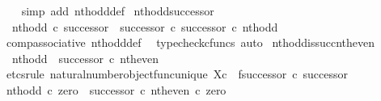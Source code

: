 \begin{isabellebody}
%
\isadelimproof
\ \ %
\endisadelimproof
%
\isatagproof
{}\isamarkupfalse%
\ {\isacharparenleft}{\kern0pt}simp\ add{\isacharcolon}{\kern0pt}\ nth{\isacharunderscore}{\kern0pt}odd{\isacharunderscore}{\kern0pt}def{}{\isacharparenright}{\kern0pt}%
\endisatagproof
{\isafoldproof}%
%
\isadelimproof
\isanewline
%
\endisadelimproof
\isanewline
{}\isamarkupfalse%
\ nth{\isacharunderscore}{\kern0pt}odd{\isacharunderscore}{\kern0pt}successor{}{\isacharcolon}{\kern0pt}\isanewline
\ \ {\isachardoublequoteopen}nth{\isacharunderscore}{\kern0pt}odd\ {\isasymcirc}\isactrlsub c\ successor\ {\isacharequal}{\kern0pt}\ successor\ {\isasymcirc}\isactrlsub c\ successor\ {\isasymcirc}\isactrlsub c\ nth{\isacharunderscore}{\kern0pt}odd{\isachardoublequoteclose}\isanewline
%
\isadelimproof
\ \ %
\endisadelimproof
%
\isatagproof
{}\isamarkupfalse%
\ comp{\isacharunderscore}{\kern0pt}associative{}\ nth{\isacharunderscore}{\kern0pt}odd{\isacharunderscore}{\kern0pt}def{}\ \isamarkupfalse%
\ {\isacharparenleft}{\kern0pt}typecheck{\isacharunderscore}{\kern0pt}cfuncs{\isacharcomma}{\kern0pt}\ auto{\isacharparenright}{\kern0pt}%
\endisatagproof
{\isafoldproof}%
%
\isadelimproof
\isanewline
%
\endisadelimproof
\isanewline
{}\isamarkupfalse%
\ nth{\isacharunderscore}{\kern0pt}odd{\isacharunderscore}{\kern0pt}is{\isacharunderscore}{\kern0pt}succ{\isacharunderscore}{\kern0pt}nth{\isacharunderscore}{\kern0pt}even{\isacharcolon}{\kern0pt}\isanewline
\ \ {\isachardoublequoteopen}nth{\isacharunderscore}{\kern0pt}odd\ {\isacharequal}{\kern0pt}\ successor\ {\isasymcirc}\isactrlsub c\ nth{\isacharunderscore}{\kern0pt}even{\isachardoublequoteclose}\isanewline
%
\isadelimproof
%
\endisadelimproof
%
\isatagproof
{}\isamarkupfalse%
\ {\isacharparenleft}{\kern0pt}etcs{\isacharunderscore}{\kern0pt}rule\ natural{\isacharunderscore}{\kern0pt}number{\isacharunderscore}{\kern0pt}object{\isacharunderscore}{\kern0pt}func{\isacharunderscore}{\kern0pt}unique{\isacharbrackleft}{\kern0pt}\ X{\isacharequal}{\kern0pt}{\isachardoublequoteopen}{\isasymnat}\isactrlsub c{\isachardoublequoteclose}{\isacharcomma}{\kern0pt}\ \ f{\isacharequal}{\kern0pt}{\isachardoublequoteopen}successor\ {\isasymcirc}\isactrlsub c\ successor{\isachardoublequoteclose}{\isacharbrackright}{\kern0pt}{\isacharparenright}{\kern0pt}\isanewline
\ \ \isamarkupfalse%
\ {\isachardoublequoteopen}nth{\isacharunderscore}{\kern0pt}odd\ {\isasymcirc}\isactrlsub c\ zero\ {\isacharequal}{\kern0pt}\ {\isacharparenleft}{\kern0pt}successor\ {\isasymcirc}\isactrlsub c\ nth{\isacharunderscore}{\kern0pt}even{\isacharparenright}{\kern0pt}\ {\isasymcirc}\isactrlsub c\ zero{\isachardoublequoteclose}\isanewline

\end{isabellebody}
